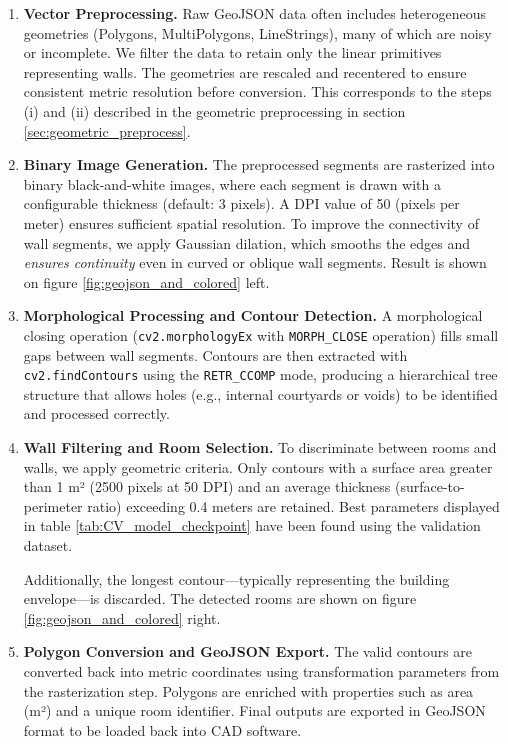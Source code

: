 \documentclass[11pt]{article}
\begin{document}
\begin{enumerate}
    \item \textbf{Vector Preprocessing.}  %
    Raw GeoJSON data often includes heterogeneous geometries (Polygons, 
    MultiPolygons, LineStrings), many of which are noisy or incomplete. 
    We filter the data to retain only the linear primitives representing walls. 
    The geometries are rescaled and recentered to ensure consistent metric 
    resolution before conversion. This corresponds to the steps (i) and (ii)
    described in the geometric preprocessing in section \ref{sec:geometric_preprocess}.

    \item \textbf{Binary Image Generation.} 
    The preprocessed segments are rasterized into binary black-and-white images,
    where each segment is drawn with a configurable thickness (default: 3 pixels).
    A DPI value of 50 (pixels per meter) ensures sufficient spatial resolution. 
    To improve the connectivity of wall segments, we apply Gaussian dilation, 
    which smooths the edges and \emph{ensures continuity} even in curved or 
    oblique wall segments. Result is shown on figure \ref{fig:geojson_and_colored} left.

    \item \textbf{Morphological Processing and Contour Detection.} 
    A morphological closing operation (\texttt{cv2.morphologyEx} with \texttt{MORPH\_CLOSE} operation) fills
     small gaps between wall segments. Contours are then extracted with 
     \texttt{cv2.findContours} using the \texttt{RETR\_CCOMP} mode, producing a 
     hierarchical tree structure that allows holes (e.g., internal courtyards 
     or voids) to be identified and processed correctly.

    \item \textbf{Wall Filtering and Room Selection.} 
    To discriminate between rooms and walls, we apply geometric criteria. 
    Only contours with a surface area greater than 1 m² (2500 pixels at 50 DPI) 
    and an average thickness (surface-to-perimeter ratio) exceeding 0.4 meters 
    are retained. Best parameters displayed in table \ref{tab:CV_model_checkpoint}
    have been found using the validation dataset. 

    Additionally, the longest contour—typically representing the 
    building envelope—is discarded. The detected rooms are shown on figure 
    \ref{fig:geojson_and_colored} right.

    \item \textbf{Polygon Conversion and GeoJSON Export.} 
    The valid contours are converted back into metric coordinates using 
    transformation parameters from the rasterization step. Polygons are enriched 
    with properties such as area (m²) and a unique room identifier. Final outputs 
    are exported in GeoJSON format to be loaded back into CAD software.
    
\end{enumerate}
\end{document}
